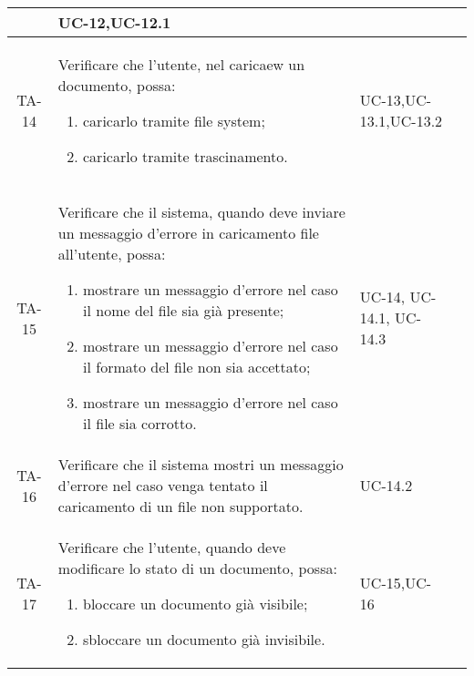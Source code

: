\begin{xltabular}{\textwidth}{| c | X | X | c |}
\begin{enumerate}
    \end{enumerate}& UC-12,\newline UC-12.1 & \textcolor{cmarkcolor}{} \\
    \hline
    TA-14 & Verificare che l’utente, nel caricaew un documento, possa:
    \begin{enumerate}
        \item caricarlo tramite file system;
        \item caricarlo tramite trascinamento.
    \end{enumerate}& UC-13,\newline UC-13.1,\newline UC-13.2 & \textcolor{cmarkcolor}{} \\
    \hline
    TA-15 & Verificare che il sistema, quando deve inviare un messaggio d'errore in caricamento file all'utente, possa:
    \begin{enumerate}
        \item mostrare un messaggio d'errore nel caso il nome del file sia già presente;
        \item mostrare un messaggio d'errore nel caso il formato del file non sia accettato;
        \item mostrare un messaggio d'errore nel caso il file sia corrotto.
        
    \end{enumerate}& UC-14, \newline UC-14.1, \newline UC-14.3 & \textcolor{xmarkcolor}{} \\
    \hline
    TA-16 & Verificare che il sistema mostri un messaggio d'errore nel caso venga tentato il caricamento di un file non supportato.& UC-14.2 & \textcolor{cmarkcolor}{} \\
    \hline

    TA-17 & Verificare che l’utente, quando deve modificare lo stato di un documento, possa:
    \begin{enumerate}
        \item bloccare un documento già visibile;
        \item sbloccare un documento già invisibile.
    \end{enumerate}& UC-15,\newline UC-16 & \textcolor{cmarkcolor}{} \\
    \hline
    

\end{xltabular}
